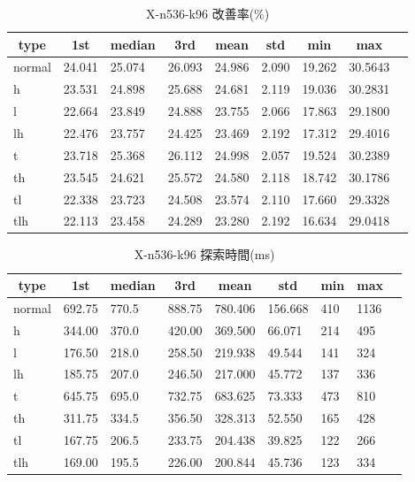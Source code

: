 \begin{table}[htbp]
    \caption{X-n536-k96 改善率(\%)}
    \begin{tabular}{|l|l|l|l|l|l|l|l|l|}\hline
    \multicolumn{1}{|c|}{\textbf{type}}
    &\multicolumn{1}{|c|}{\textbf{1st}}
    &\multicolumn{1}{c|}{\textbf{median}}
    &\multicolumn{1}{c|}{\textbf{3rd}}
    &\multicolumn{1}{c|}{\textbf{mean}}
    &\multicolumn{1}{c|}{\textbf{std}}
    &\multicolumn{1}{c|}{\textbf{min}}
    &\multicolumn{1}{c|}{\textbf{max}}\\\hline
	normal & 24.041 & 25.074 & 26.093 & 24.986 & 2.090 & 19.262 & 30.5643\\\hline
	h & 23.531 & 24.898 & 25.688 & 24.681 & 2.119 & 19.036 & 30.2831\\\hline
	l & 22.664 & 23.849 & 24.888 & 23.755 & 2.066 & 17.863 & 29.1800\\\hline
	lh & 22.476 & 23.757 & 24.425 & 23.469 & 2.192 & 17.312 & 29.4016\\\hline
	t & 23.718 & 25.368 & 26.112 & 24.998 & 2.057 & 19.524 & 30.2389\\\hline
	th & 23.545 & 24.621 & 25.572 & 24.580 & 2.118 & 18.742 & 30.1786\\\hline
	tl & 22.338 & 23.723 & 24.508 & 23.574 & 2.110 & 17.660 & 29.3328\\\hline
	tlh & 22.113 & 23.458 & 24.289 & 23.280 & 2.192 & 16.634 & 29.0418\\\hline
	\end{tabular}
\end{table}
\begin{table}[htbp]
    \caption{X-n536-k96 探索時間(ms)}
    \begin{tabular}{|l|l|l|l|l|l|l|l|l|}\hline
    \multicolumn{1}{|c|}{\textbf{type}}
    &\multicolumn{1}{|c|}{\textbf{1st}}
    &\multicolumn{1}{c|}{\textbf{median}}
    &\multicolumn{1}{c|}{\textbf{3rd}}
    &\multicolumn{1}{c|}{\textbf{mean}}
    &\multicolumn{1}{c|}{\textbf{std}}
    &\multicolumn{1}{c|}{\textbf{min}}
    &\multicolumn{1}{c|}{\textbf{max}}\\\hline
	normal & 692.75 & 770.5 & 888.75 & 780.406 & 156.668 & 410 & 1136\\\hline
	h & 344.00 & 370.0 & 420.00 & 369.500 & 66.071 & 214 & 495\\\hline
	l & 176.50 & 218.0 & 258.50 & 219.938 & 49.544 & 141 & 324\\\hline
	lh & 185.75 & 207.0 & 246.50 & 217.000 & 45.772 & 137 & 336\\\hline
	t & 645.75 & 695.0 & 732.75 & 683.625 & 73.333 & 473 & 810\\\hline
	th & 311.75 & 334.5 & 356.50 & 328.313 & 52.550 & 165 & 428\\\hline
	tl & 167.75 & 206.5 & 233.75 & 204.438 & 39.825 & 122 & 266\\\hline
	tlh & 169.00 & 195.5 & 226.00 & 200.844 & 45.736 & 123 & 334\\\hline
	\end{tabular}
\end{table}
